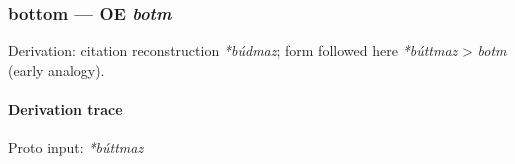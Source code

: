 \documentclass[
  british,
  a4paper,
]{article}
\begin{document}
\subsubsection{\texorpdfstring{bottom --- OE
\emph{botm}}{bottom --- OE botm}}\label{bottom-oe-botm}

Derivation: citation reconstruction \emph{*búdmaz}; form followed here
\emph{*búttmaz} \textgreater{} \emph{botm} (early analogy).

\paragraph{Derivation trace}\label{derivation-trace-86}

Proto input: \emph{*búttmaz}

\begingroup
\setlength{\fboxsep}{6pt}
\end{document}
